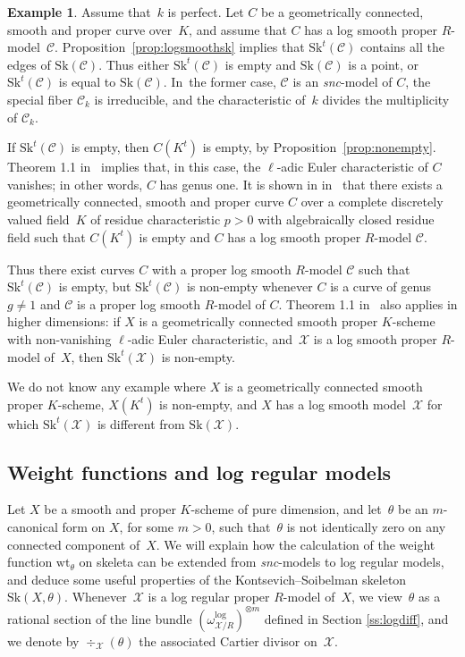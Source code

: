 \documentclass[11pt]{article}
\theoremstyle{definition}
\newtheorem{example}[equation]{Example}
\numberwithin{equation}{subsection}
\newcommand{\cX}{\ensuremath{\mathscr{X}}}
\newcommand{\cC}{\ensuremath{\mathscr{C}}}
\newcommand{\snc}{\textit{snc}}
\newcommand{\Sk}{\mathrm{Sk}}
\newcommand{\wt}{\mathrm{wt}}
\let\form\theta
\begin{document}
\begin{example}
Assume that~$k$ is perfect. Let $C$ be a geometrically connected, smooth and proper curve over~$K$, and assume that $C$ has a log smooth proper $R$\nobreakdash-model~$\cC$. Proposition~\ref{prop:logsmoothsk} implies that
$\Sk^t(\cC)$ contains all the edges of $\Sk(\cC)$.
Thus either $\Sk^t(\cC)$ is empty and $\Sk(\cC)$ is a point, or $\Sk^t(\cC)$ is equal to $\Sk(\cC)$.
In~the former case, $\cC$ is an \snc-model of $C$, the special fiber $\cC_k$ is irreducible, and the characteristic of~$k$ divides the multiplicity of $\cC_k$.

If $\Sk^t(\cC)$ is empty, then $C(K^t)$ is empty, by Proposition~\ref{prop:nonempty}.
Theorem 1.1 in~\cite{mitsui-smeets} implies that, in this case, the $\ell$-adic Euler characteristic of $C$ vanishes; in other words, $C$ has genus one.
It is shown in in~\cite{mitsui-smeets} that there exists a geometrically connected, smooth and proper curve $C$ over a complete discretely valued field~$K$ of residue characteristic $p>0$ with algebraically closed residue field such that $C(K^t)$ is
empty and $C$ has a log smooth proper $R$\nobreakdash-model $\cC$.

Thus there exist curves $C$ with a proper log smooth $R$\nobreakdash-model $\cC$ such that $\Sk^t(\cC)$ is empty, but $\Sk^t(\cC)$ is non-empty whenever $C$ is a curve of genus $g\neq 1$ and $\cC$ is a proper log smooth $R$\nobreakdash-model of $C$.
Theorem 1.1 in~\cite{mitsui-smeets} also applies in higher dimensions:
if $X$ is a geometrically connected smooth proper $K$\nobreakdash-scheme with non-vanishing $\ell$-adic Euler characteristic, and~$\cX$ is a log smooth proper $R$\nobreakdash-model of~$X$, then $\Sk^t(\cX)$ is non-empty.

We do not know any example where $X$ is a geometrically connected smooth proper $K$\nobreakdash-scheme,
$X(K^t)$ is non-empty, and $X$ has a log smooth model~$\cX$ for which $\Sk^t(\cX)$ is different from $\Sk(\cX)$.
\end{example}

\subsection{Weight functions and log regular models}
Let $X$ be a smooth and proper $K$\nobreakdash-scheme of pure dimension, and let~$\form$ be an $m$-canonical form on $X$, for some $m>0$, such that~$\form$ is not identically zero on any connected component of~$X$. We will explain how the calculation of the weight function $\wt_{\form}$ on skeleta can be extended from \snc-models to log regular models, and deduce some useful properties of the Kontsevich--Soibelman skeleton $\Sk(X,\form)$. Whenever~$\cX$ is a log regular proper $R$\nobreakdash-model of~$X$, we view~$\form$ as a rational section of the line bundle $(\omega^{\log}_{\cX/R})^{\otimes m}$ defined in Section \ref{ss:logdiff}, and we denote by $\div_{\cX}(\form)$ the associated Cartier divisor on~$\cX$.
\end{document}
